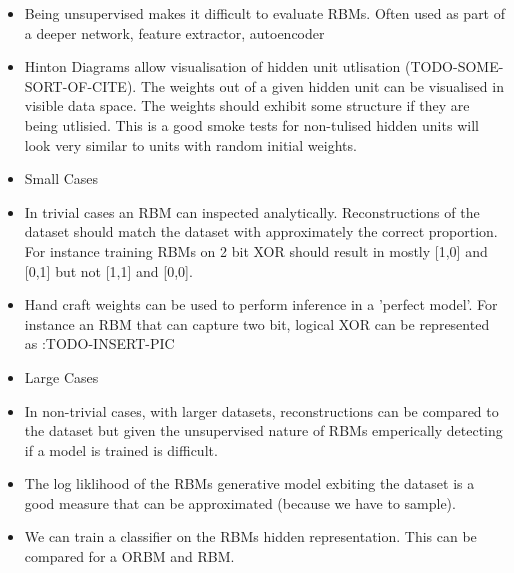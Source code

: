     \begin{itemize}
      \item Being unsupervised makes it difficult to evaluate RBMs. Often used as part of a deeper network, feature extractor, autoencoder
      \item Hinton Diagrams allow visualisation of hidden unit utlisation (TODO-SOME-SORT-OF-CITE). The weights out of a given hidden unit can be visualised in visible data space. The weights should exhibit some structure if they are being utlisied. This is a good smoke tests for non-tulised hidden units will look very similar to units with random initial weights.

        \item Small Cases

          \item In trivial cases an RBM can inspected analytically. Reconstructions of the dataset should match the dataset with approximately the correct proportion. For instance training RBMs on 2 bit XOR should result in mostly [1,0] and [0,1] but not [1,1] and [0,0].
          \item Hand craft weights can be used to perform inference in a 'perfect model'. For instance an RBM that can capture two bit, logical XOR can be represented as :TODO-INSERT-PIC

        \item Large Cases

          \item In non-trivial cases, with larger datasets, reconstructions can be compared to the dataset but given the unsupervised nature of RBMs emperically detecting if a model is trained is difficult.
          \item The log liklihood of the RBMs generative model exbiting the dataset is a good measure that can be approximated (because we have to sample).
          \item We can train a classifier on the RBMs hidden representation. This can be compared for a ORBM and RBM.


    \end{itemize}

